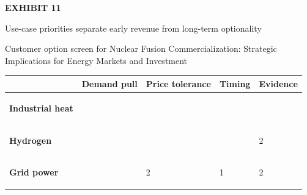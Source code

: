 \documentclass[10pt,a4paper]{article}
\begin{document}
\clearpage
{\textcolor{BOGreen}{\scriptsize\bfseries EXHIBIT 11}}\par\vspace{4pt}
{\sffamily\fontsize{17}{21}\selectfont\color{BONavy} Use-case priorities separate early revenue from long-term optionality}\par
{\small\color{BOText} Customer option screen for Nuclear Fusion Commercialization: Strategic Implications for Energy Markets and Investment}\par\vspace{6pt}
{\scriptsize\begin{tabular}{p{38mm}>{\centering\arraybackslash}p{21mm}>{\centering\arraybackslash}p{21mm}>{\centering\arraybackslash}p{21mm}>{\centering\arraybackslash}p{21mm}}
 & {\bfseries Demand pull} & {\bfseries Price tolerance} & {\bfseries Timing} & {\bfseries Evidence} \\
\hline
{\bfseries Industrial heat} & \colorbox{BOGreen}{\textcolor{white}{\strut\hspace{5pt}5\hspace{5pt}}} & \colorbox{BOGreen}{\textcolor{white}{\strut\hspace{5pt}4\hspace{5pt}}} & \colorbox{BOBlue}{\textcolor{white}{\strut\hspace{5pt}3\hspace{5pt}}} & \colorbox{BOBlue}{\textcolor{white}{\strut\hspace{5pt}3\hspace{5pt}}} \\
{\bfseries Hydrogen} & \colorbox{BOGreen}{\textcolor{white}{\strut\hspace{5pt}4\hspace{5pt}}} & \colorbox{BOGreen}{\textcolor{white}{\strut\hspace{5pt}4\hspace{5pt}}} & \colorbox{BOBlue}{\textcolor{white}{\strut\hspace{5pt}3\hspace{5pt}}} & \colorbox{BOLight}{\textcolor{BOText}{\strut\hspace{5pt}2\hspace{5pt}}} \\
{\bfseries Grid power} & \colorbox{BOGreen}{\textcolor{white}{\strut\hspace{5pt}5\hspace{5pt}}} & \colorbox{BOLight}{\textcolor{BOText}{\strut\hspace{5pt}2\hspace{5pt}}} & \colorbox{BOLight}{\textcolor{BOText}{\strut\hspace{5pt}1\hspace{5pt}}} & \colorbox{BOLight}{\textcolor{BOText}{\strut\hspace{5pt}2\hspace{5pt}}} \\

\end{tabular}}
\end{document}
